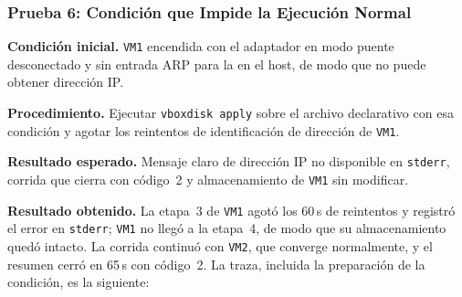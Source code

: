 \subsubsection{Prueba 6: Condición que Impide la Ejecución Normal}
\label{subsub:prueba6}

\textbf{Condición inicial.} \texttt{VM1} encendida con el adaptador en modo puente desconectado y sin entrada ARP para la \vm{} en el host, de modo que no puede obtener dirección IP.

\textbf{Procedimiento.} Ejecutar \texttt{vboxdisk apply} sobre el archivo declarativo con esa condición y agotar los reintentos de identificación de dirección de \texttt{VM1}.

\textbf{Resultado esperado.} Mensaje claro de dirección IP no disponible en \texttt{stderr}, corrida que cierra con código~2 y almacenamiento de \texttt{VM1} sin modificar.

\textbf{Resultado obtenido.} La etapa~3 de \texttt{VM1} agotó los 60\,s de reintentos y registró el error en \texttt{stderr}; \texttt{VM1} no llegó a la etapa~4, de modo que su almacenamiento quedó intacto. La corrida continuó con \texttt{VM2}, que converge normalmente, y el resumen cerró en 65\,s con código~2. La traza, incluida la preparación de la condición, es la siguiente:

